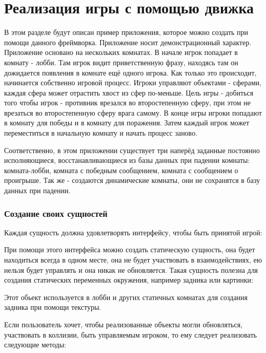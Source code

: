\documentclass[a4paper,14pt, openany]{book}
\begin{document}
\chapter{Реализация игры с помощью движка}

В этом разделе будут описан пример приложения, которое можно создать при помощи данного фреймворка. Приложение носит демонстрационный характер. Приложение основано на нескольких комнатах. В начале игрок попадает в комнату - лобби. Там игрок видит приветственную фразу, находясь там он дожидается появления в комнате ещё одного игрока. Как только это происходит, начинается собственно игровой процесс. Игроки управляют объектами - сферами, каждая сфера может отрастить хвост из сфер по-меньше. Цель игры -  добиться того чтобы игрок - противник врезался во второстепенную сферу, при этом не врезаться во второстепенную сферу врага самому. В конце игры игроки попадают в комнату для победы и в комнату для поражения. Затем каждый игрок может переместиться в начальную комнату и начать процесс заново.

Соответственно, в этом приложении существует три наперёд заданные постоянно исполняющиеся, восстанавливающиеся из базы данных при падении комнаты: комната-лобби, комната с победным сообщением, комната с сообщением о проигрыше. Так же - создаются динамические комнаты, они не сохранятся в базу данных при падении.  

\subsection{Создание своих сущностей}

Каждая сущность должна удовлетворять интерфейсу, чтобы быть принятой игрой:


При помощи этого интерфейса можно создать статическую сущность, она будет находиться всегда в одном месте, она не будет участвовать в взаимодействиях, ею нельзя будет управлять и она никак не обновляется. Такая сущность полезна для создания статических переменных окружения, например задника или картинки:


Этот обьект используется в лобби и других статичных комнатах для создания задника при помощи текстуры.

Если пользователь хочет, чтобы реализованные объекты могли обновляться, участвовать в коллизии, быть управляемым игроком, то ему следует реализовать следующие методы:

\end{document}
